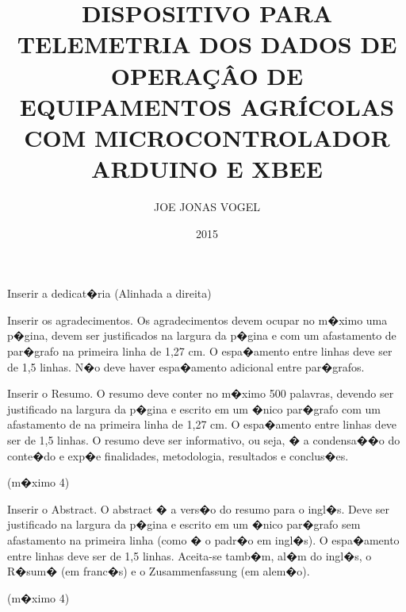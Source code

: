 \documentclass[msc, oneside]{ppgiathesis}
\author{JOE JONAS VOGEL}
\title{DISPOSITIVO PARA TELEMETRIA DOS DADOS DE OPERAÇÂO DE EQUIPAMENTOS AGRÍCOLAS COM MICROCONTROLADOR ARDUINO E XBEE}
\date{2015}
\begin{document}
\frontpage



\begin{dedicatory}
    Inserir a dedicat�ria (Alinhada a direita)
\end{dedicatory}


\acknowledgements

Inserir os agradecimentos. Os agradecimentos devem ocupar no
m�ximo uma p�gina, devem ser justificados na largura da p�gina e
com um afastamento de par�grafo na primeira linha de 1,27 cm. O
espa�amento entre linhas deve ser de 1,5 linhas. N�o deve haver
espa�amento adicional entre par�grafos.

\tableofcontents

\listoffigures

\listoftables

\listofsymbols

\listofabreviations

\resumo

\noindent Inserir o Resumo. O resumo deve conter no m�ximo 500
palavras, devendo ser justificado na largura da p�gina e escrito
em um �nico par�grafo com um afastamento de na primeira linha de
1,27 cm. O espa�amento entre linhas deve ser de 1,5 linhas. O
resumo deve ser informativo, ou seja, � a condensa��o do conte�do
e exp�e finalidades, metodologia, resultados e conclus�es.
\begin{keywords}
    (m�ximo 4)
\end{keywords}

\abstract

\noindent Inserir o Abstract. O abstract � a vers�o do resumo para
o ingl�s. Deve ser justificado na largura da p�gina e escrito em
um �nico par�grafo sem afastamento na primeira linha (como � o
padr�o em ingl�s). O espa�amento entre linhas deve ser de 1,5
linhas. Aceita-se tamb�m, al�m do ingl�s, o R�sum� (em franc�s) e
o Zusammenfassung (em alem�o).

\begin{keywords}
    (m�ximo 4)
\end{keywords}
\end{document}

